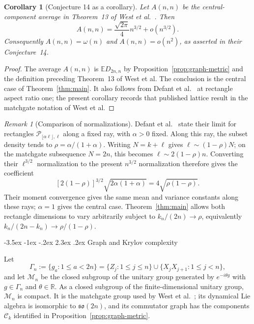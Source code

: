 \documentclass[twoside,10pt]{article}
\makeatletter
\numberwithin{equation}{section}
\theoremstyle{slbody}
\newtheorem{corollary}[theorem]{Corollary}
\theoremstyle{definition}
\theoremstyle{remark}
\newtheorem{remark}[theorem]{Remark}
\newcommand{\E}{\mathbb{E}}
\newcommand{\1}{\mathbf{1}}
\renewcommand{\section}{%
  \@startsection{section}{1}{\z@}%
    {-3.5ex \@plus -1ex \@minus -.2ex}%
    {2.3ex \@plus .2ex}%
    {\normalfont\large\bfseries}}
\makeatother
\begin{document}
\begin{corollary}[Conjecture 14 as a corollary]\label{cor:conjecture}
Let $A(n,n)$ be the central-component average in Theorem~13 of
West et al.~\cite[Theorem~13 and Conjecture~14]{WestEtAl}.  Then
\[
 A(n,n)=\frac{\sqrt{2\pi}}4n^{3/2}+o(n^{3/2}).
\]
Consequently $A(n,n)=\omega(n)$ and $A(n,n)=o(n^2)$, as asserted in their
Conjecture~14.
\end{corollary}

\begin{proof}
The average $A(n,n)$ is $\E D_{2n,n}$ by Proposition~\ref{prop:graph-metric}
and the definition preceding Theorem~13 of West et al.  The conclusion is
the central case of Theorem~\ref{thm:main}.  It also follows from
Defant et al.~\cite[Proposition~5]{DefantEtAl} at rectangle aspect ratio one;
the present corollary records that published lattice result in the matchgate
notation of West et al.
\end{proof}

\begin{remark}[Comparison of normalizations]
Defant et al.~\cite[Proposition~5]{DefantEtAl} state their limit for rectangles
$\mathcal P_{\lfloor\alpha\ell\rfloor,\ell}$ along a fixed ray, with
$\alpha>0$ fixed.  Along this ray, the subset density tends to
$\rho=\alpha/(1+\alpha)$.  Writing $N=k+\ell$ gives
$\ell\sim(1-\rho)N$; on the matchgate subsequence $N=2n$, this becomes
$\ell\sim2(1-\rho)n$.  Converting their $\ell^{3/2}$ normalization to the
present $n^{3/2}$ normalization therefore gives the coefficient
\[
 [2(1-\rho)]^{3/2}\sqrt{2\alpha(1+\alpha)}
 =4\sqrt{\rho(1-\rho)}.
\]
Their moment convergence gives the same mean and variance constants along
these rays; $\alpha=1$ gives the central case.  Theorem~\ref{thm:main}
allows both rectangle dimensions to vary arbitrarily subject to
$k_n/(2n)\to\rho$, equivalently $k_n/(2n-k_n)\to\rho/(1-\rho)$.
\end{remark}

\section{Graph and Krylov complexity}

Let
\begin{equation}\label{eq:matchgate-generators}
 \Gamma_n:=\{g_a:1\leq a<2n\}
 =\{Z_j:1\leq j\leq n\}
 \cup\{X_jX_{j+1}:1\leq j<n\},
\end{equation}
and let $\mathcal M_n$ be the closed subgroup of the unitary group generated
by $e^{-i\theta g}$ with $g\in\Gamma_n$ and $\theta\in\mathbb R$.  As a
closed subgroup of the finite-dimensional unitary group, $\mathcal M_n$ is
compact.  It is the matchgate group used by West et
al.~\cite[Table~I and the discussion following Eq.~(44)]{WestEtAl}; its
dynamical Lie algebra is isomorphic to $\mathfrak{so}(2n)$, and its commutator
graph has the components $\mathcal C_k$ identified in
Proposition~\ref{prop:graph-metric}.
\end{document}
